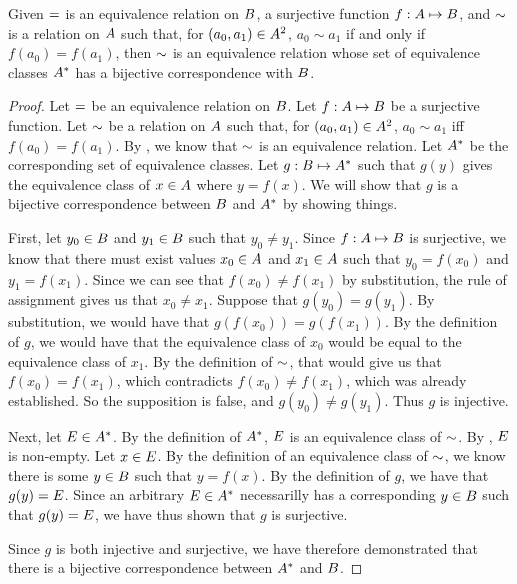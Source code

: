 \documentclass[main.tex]{subfiles}
\begin{document}
\begin{thm}
	Given \({=}\) is an equivalence relation on \({B}\),
	a surjective function \({f}: {{A}} \mapsto{} {{B}}\), and
	\({\sim}\) is a relation on \({A}\) such that, for
	\(({a_0},{a_1}) \in {{A}^2}\), \({a_0} \sim {a_1}\) if and
	only if \(f(a_0) = f(a_1)\), then \({\sim}\) is an
	equivalence relation whose set of equivalence classes \({A^*}\)
	has a bijective correspondence with \({B}\).
\end{thm}
\begin{proof}
	Let \({=}\) be an equivalence relation on \({B}\).
	Let \({f}: {{A}} \mapsto{} {{B}}\) be a surjective function.
	Let \({\sim}\) be a relation on \({A}\) such that,
	for \(({a_0},{a_1}) \in {{A}^2}\), \({a_0} \sim {a_1}\) iff
	\(f(a_0) = f(a_1)\). By , we know that
	\({\sim}\) is an equivalence relation. Let \({A^*}\)
	be the corresponding set of equivalence classes. Let
	\({g}: {{B}} \mapsto{} {{A^*}}\) such that \(g(y)\) gives the
	equivalence class of \(x \in {A}\) where \(y = f(x)\). We will
	show that \(g\) is a bijective correspondence between \({B}\)
	and \({A^*}\) by showing things.

	First, let \({y_0} \in {B}\) and \({y_1} \in {B}\) such
	that \({y_0} \neq {y_1}\). Since \({f}: {{A}} \mapsto{} {{B}}\)
	is surjective, we know that there must exist values
	\({x_0} \in {A}\) and \({x_1} \in {A}\) such that
	\({y_0} = f(x_0)\) and \({y_1} = f(x_1)\). Since we can see that
	\(f(x_0) \neq f(x_1)\) by substitution, the rule of assignment gives us
	that \({x_0} \neq {x_1}\). Suppose that \(g(y_0) = g(y_1)\). By
	substitution, we would have that \(g(f(x_0)) = g(f(x_1))\). By the
	definition of \(g\), we would have that the equivalence class of \(x_0\)
	would be equal to the equivalence class of \(x_1\). By the definition of
	\({\sim}\), that would give us that \(f(x_0) = f(x_1)\),
	which contradicts \(f(x_0) \neq f(x_1)\), which was already established.
	So the supposition is false, and \(g(y_0) \neq g(y_1)\). Thus \(g\) is
	injective.

	Next, let \({E} \in {A^*}\). By the definition of
	\({A^*}\), \({E}\) is an equivalence class of
	\({\sim}\). By , \({E}\) is
	non-empty. Let \(x \in {E}\). By the definition of an equivalence
	class of \({\sim}\), we know there is some
	\(y \in {B}\) such that \(y = f(x)\). By the definition of \(g\),
	we have that \(g(y) = {E}\). Since an arbitrary
	\({E} \in {A^*}\) necessarilly has a corresponding
	\(y \in {B}\) such that \(g(y) = {E}\), we have thus shown
	that \(g\) is surjective.

	Since \(g\) is both injective and surjective, we have therefore
	demonstrated that there is a bijective correspondence between
	\({A^*}\) and \({B}\).
\end{proof}
\end{document}
